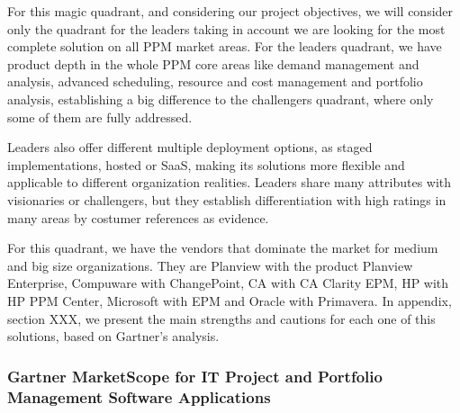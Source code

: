 For this magic quadrant, and considering our project objectives, we will consider only the quadrant for the leaders taking in account we are looking for the most complete solution on all PPM market areas. For the leaders quadrant, we have product depth in the whole PPM core areas like demand management and analysis, advanced scheduling, resource and cost management and portfolio analysis, establishing a big difference to the challengers quadrant, where only some of them are fully addressed.\par
Leaders also offer different multiple deployment options, as staged implementations, hosted or SaaS, making its solutions more flexible and applicable to different organization realities. Leaders share many attributes with visionaries or challengers, but they establish differentiation with high ratings in many areas by costumer references as evidence.\par
For this quadrant, we have the vendors that dominate the market for medium and big size organizations. They are Planview with the product Planview Enterprise, Compuware with ChangePoint, CA with CA Clarity EPM, HP with HP PPM Center, Microsoft with EPM and Oracle with Primavera. In appendix, section XXX, we present the main strengths and cautions for each one of this solutions, based on Gartner's analysis.


\subsubsection{Gartner MarketScope for IT Project and Portfolio Management Software Applications}

